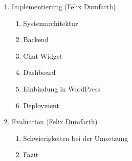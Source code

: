 \begin{enumerate}
\begin{enumerate}
    \end{enumerate}
    \item Implementierung (Felix Dumfarth)
    \begin{enumerate}
        \item Systemarchitektur
        \item Backend
        \item Chat Widget
        \item Dashboard
        \item Einbindung in WordPress
        \item Deployment
    \end{enumerate}
    \item Evaluation (Felix Dumfarth)
    \begin{enumerate}
        \item Schwierigkeiten bei der Umsetzung
        \item Fazit
    \end{enumerate}
\end{enumerate}

